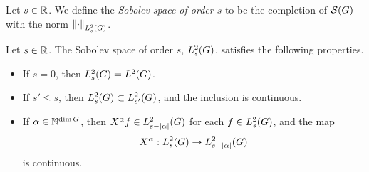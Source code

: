 \begin{definition}
\label{definition:Sobolev_spaces}
    Let $s \in \R$.
    We define the \emph{Sobolev space of order $s$} to be the completion of $\Schwartz\Group$ with the norm $\norm[\Sobolev{s}]{\dummy}$.
\end{definition}

\begin{proposition}
\label{proposition:elementary_properties_of_Sobolev_spaces}
    Let $s \in \R$.
    The Sobolev space of order $s$, $\Sobolev s$, satisfies the following properties.
    \begin{itemize}
        \item If $s = 0$, then $\Sobolev s = \Lebesgue 2 \Group$.
        \item If $s' \leq s$, then $\Sobolev s \subset \Sobolev {s'}$,
            and the inclusion is continuous.
        \item If $\alpha \in \N^{\dim \Group}$, then $\LeftDifferentialOperator \alpha f \in \Sobolev {s - \abs \alpha}$
            for each $f \in \Sobolev s$,
            and the map
            \begin{align*}
                \LeftDifferentialOperator \alpha : \Sobolev s \to \Sobolev {s - \abs \alpha}
            \end{align*}
            is continuous.
    \end{itemize}
\end{proposition}
